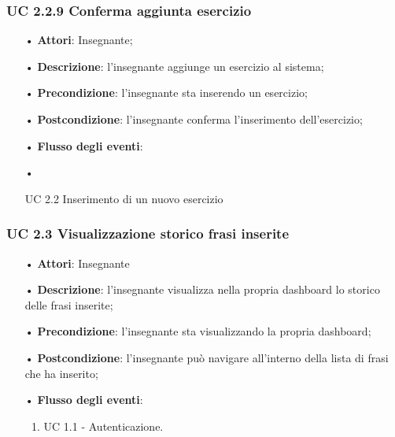\subsubsection{UC 2.2.9 Conferma aggiunta esercizio}
\begin{itemize}
	\item[•] \textbf{Attori}: Insegnante;
	\item[•] \textbf{Descrizione}: l'insegnante aggiunge un esercizio al sistema;
	\item[•] \textbf{Precondizione}: l’insegnante sta inserendo un esercizio;
	\item[•] \textbf{Postcondizione}: l'insegnante conferma l'inserimento dell'esercizio;
	\item[•] \textbf{Flusso degli eventi}: 
	\item[•] \begin{enumerate}
	UC 2.2 Inserimento di un nuovo esercizio
	\end{enumerate}
\end{itemize}

\subsubsection{UC 2.3 Visualizzazione storico frasi inserite}
\begin{itemize}
	\item[•] \textbf{Attori}: Insegnante	   
	\item[•] \textbf{Descrizione}: l’insegnante visualizza nella propria dashboard lo storico delle frasi inserite; 
	\item[•] \textbf{Precondizione}: l'insegnante sta visualizzando la propria dashboard;
	\item[•] \textbf{Postcondizione}: l’insegnante può navigare all’interno della lista di frasi che ha inserito;
	\item[•] \textbf{Flusso degli eventi}:
	\begin{enumerate}
		\item UC 1.1 - Autenticazione.
	\end{enumerate}
\end{itemize}



